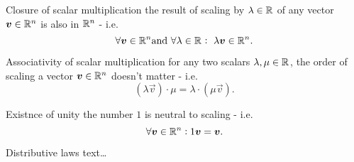\begin{descitemize}
    \item[Closure of scalar multiplication] the result of scaling by $\lambda\in\Rs$ of any vector $\vec{v}\in\Rs[n]$ is also in $\Rs[n]$ - i.e. 
    \begin{equation}
        \forall\vec{v}\in\Rs[n] \text{and}\ \forall\lambda\in\Rs:\ \lambda\vec{v}\in\Rs[n].
        \label{eq:scalar_multiplication_closure}
    \end{equation}

    \item[Associativity of scalar multiplication] for any two scalars $\lambda,\mu\in\Rs$, the order of scaling a vector $\vec{v}\in\Rs[n]$ doesn't matter - i.e.
    \begin{equation}
        \left(\lambda\vec{v}\right)\cdot\mu = \lambda\cdot\left(\mu\vec{v}\right).
        \label{eq:scalar_multiplication_associative}
    \end{equation}

    \item[Existnce of unity] the number $1$ is neutral to scaling - i.e.
        \begin{equation}
            \forall \vec{v}\in\Rs[n]: 1\vec{v}=\vec{v}.
            \label{eq:scalar_multiplication_unity}
        \end{equation}

    \item[Distributive laws] text\ldots
\end{descitemize}
